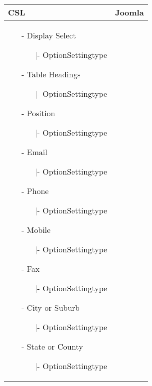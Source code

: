 \begin{minipage}{0.7\textwidth}
\begin{tabular}{|p{} | p{}|}
\hline
\textbf{CSL} & \textbf{Joomla} \\ 
\hline
\begin{itemize}
		\item[-] Display Select
		\begin{enumerate}
	   			\item[|-] OptionSettingtype
	   		\end{enumerate}  
		\item[-] Table Headings
		\begin{enumerate}
   			\item[|-] OptionSettingtype
   		\end{enumerate} 
		\item[-] Position
			\begin{enumerate}
		   			\item[|-] OptionSettingtype
		   		\end{enumerate} 
		\item[-] Email
			\begin{enumerate}
		   			\item[|-] OptionSettingtype
		   		\end{enumerate} 
		\item[-] Phone
			\begin{enumerate}
		   			\item[|-] OptionSettingtype
		   		\end{enumerate} 
		\item[-] Mobile
			\begin{enumerate}
		   			\item[|-] OptionSettingtype
		   		\end{enumerate} 
		\item[-] Fax
			\begin{enumerate}
		   			\item[|-] OptionSettingtype
		   		\end{enumerate} 
		\item[-] City or Suburb
			\begin{enumerate}
		   			\item[|-] OptionSettingtype
		   		\end{enumerate} 
		\item[-] State or County
			\begin{enumerate}
		   			\item[|-] OptionSettingtype

\end{enumerate}
\end{itemize}
\end{tabular}
\end{minipage}

